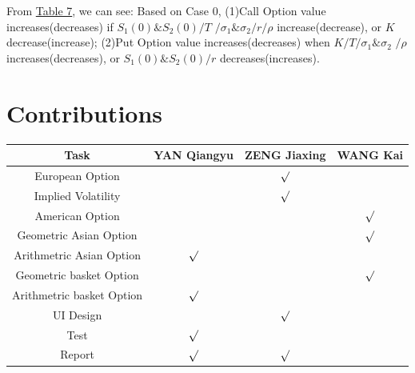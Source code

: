 \documentclass[11pt,a4paper]{article}
\begin{document}
    From \hyperref[T7]{Table 7}, we can see: Based on Case 0, 
    (1)Call Option value increases(decreases) if
    $ S_1(0)\&S_2(0) /  T $ 
    $/ \sigma_1 \& \sigma_2 / r / \rho$ 
    increase(decrease), or $ K$ decrease(increase); 
    (2)Put Option value increases(decreases) when
    $ K / T / \sigma_1\&\sigma_2$ 
    $ / \rho$ increases(decreases), 
    or $ S_1(0)\&S_2(0) / r$ decreases(increases).




    \section{Contributions}
    \begin{table}[h]
    \centering
    \begin{tabular}{|c|c|c|c|}
        \hline
        Task & YAN Qiangyu & ZENG Jiaxing & WANG Kai \\
        \hline
        European Option & & $\surd$ & \\
        \hline
        Implied Volatility && $\surd$ & \\
        \hline
        American Option &&& $\surd$ \\
        \hline
        Geometric Asian Option &&& $\surd$ \\
        \hline
        Arithmetric Asian Option & $\surd$ && \\
        \hline
        Geometric basket Option &&& $\surd$ \\
        \hline
        Arithmetric basket Option & $\surd$ && \\
        \hline
        UI Design && $\surd$ & \\
        \hline
        Test & $\surd$ & &  \\
        \hline
        Report & $\surd$ & $\surd$ &  \\
        \hline
    \end{tabular}
    \end{table}

    
\end{document}
